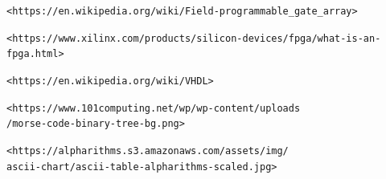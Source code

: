 \documentclass[12pt,a4paper]{article}
\begin{document}
\newpage


\raggedright

\newpage                                                                                %
\begin{thebibliography}{}

\texttt{<https://en.wikipedia.org/wiki/Field-programmable\_gate\_array>}

\texttt{<https://www.xilinx.com/products/silicon-devices/fpga/what-is-an-fpga\newline .html>}


\texttt{<https://en.wikipedia.org/wiki/VHDL>}

\texttt{<https://www.101computing.net/wp/wp-content/uploads\\
/morse-code-binary-tree-bg.png>}

\texttt{<https://alpharithms.s3.amazonaws.com/assets/img/ \\
ascii-chart/ascii-table-alpharithms-scaled.jpg>}



\end{thebibliography}



\clearpage
\end{document}
